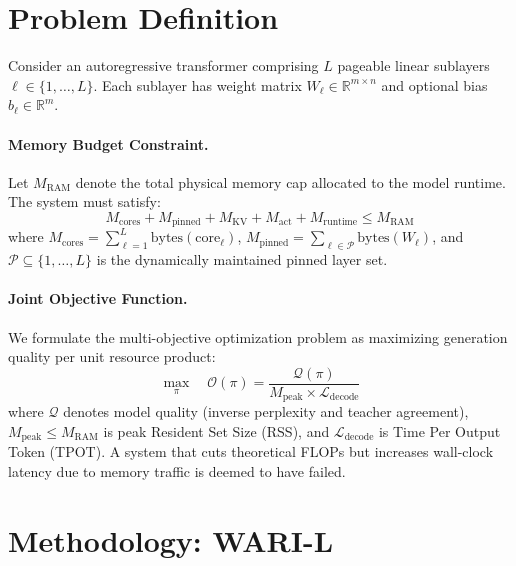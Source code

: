 \documentclass[11pt,a4paper]{article}
\begin{document}
\section{Problem Definition}
Consider an autoregressive transformer comprising $L$ pageable linear sublayers $\ell \in \{1, \dots, L\}$. Each sublayer has weight matrix $W_\ell \in \mathbb{R}^{m \times n}$ and optional bias $b_\ell \in \mathbb{R}^m$. 

\paragraph{Memory Budget Constraint.}
Let $M_{\text{RAM}}$ denote the total physical memory cap allocated to the model runtime. The system must satisfy:
\begin{equation}
    M_{\text{cores}} + M_{\text{pinned}} + M_{\text{KV}} + M_{\text{act}} + M_{\text{runtime}} \le M_{\text{RAM}}
\end{equation}
where $M_{\text{cores}} = \sum_{\ell=1}^L \text{bytes}(\text{core}_\ell)$, $M_{\text{pinned}} = \sum_{\ell \in \mathcal{P}} \text{bytes}(W_\ell)$, and $\mathcal{P} \subseteq \{1, \dots, L\}$ is the dynamically maintained pinned layer set.

\paragraph{Joint Objective Function.}
We formulate the multi-objective optimization problem as maximizing generation quality per unit resource product:
\begin{equation}
    \max_{\pi} \quad \mathcal{O}(\pi) = \frac{\mathcal{Q}(\pi)}{M_{\text{peak}} \times \mathcal{L}_{\text{decode}}}
\end{equation}
where $\mathcal{Q}$ denotes model quality (inverse perplexity and teacher agreement), $M_{\text{peak}} \le M_{\text{RAM}}$ is peak Resident Set Size (RSS), and $\mathcal{L}_{\text{decode}}$ is Time Per Output Token (TPOT). A system that cuts theoretical FLOPs but increases wall-clock latency due to memory traffic is deemed to have failed.

\section{Methodology: WARI-L}
\end{document}
